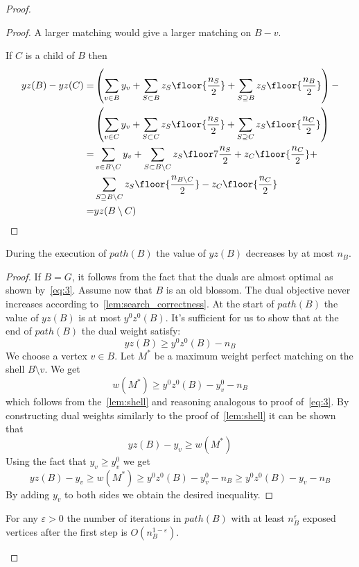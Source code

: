\begin{proof}
\begin{proof}
    A larger matching would give a larger matching on $B - v$.

    If $C$ is a child of $B$ then
    \begin{align*}
    yz(B) - yz(C) =& 
      \left(\sum_{v \in B} y_v + \sum_{S \subset B} z_S \floor{\frac{n_S}{2}} + \sum_{S \supseteq B} z_S \floor{\frac{n_B}{2}}\right) - \\
    & \left(\sum_{v \in C} y_v + \sum_{S \subset C} z_S \floor{\frac{n_S}{2}} + \sum_{S \supseteq C} z_S \floor{\frac{n_C}{2}}\right)  \\
    =& \sum_{v \in B \setminus C} y_v + \sum_{S \subset B \setminus C} z_S \floor7 {\frac{n_S}{2}} + z_C\floor{\frac{n_C}{2}} + \\
    & \sum_{S \supseteq B \setminus C} z_S \floor{\frac{n_{B \setminus C}}{2}} - z_C\floor{\frac{n_C}{2}} \\
    =& yz(B \setminus C)
    \end{align*}
\end{proof}

\begin{lemma}\label{lem:pathyz}
    During the execution of $path(B)$ the value of $yz(B)$ decreases by at most $n_B$.
\end{lemma}

\begin{proof}
    If $B = G$, it follows from the fact that the duals are almost optimal as shown by~\ref{eq:3}.
    Assume now that $B$ is an old blossom. The dual objective never increases according to~\ref{lem:search_correctness}. At the start of $path(B)$ the value of $yz(B)$ is at most $y^0z^0(B)$. It's sufficient for us to show that at the end of $path(B)$ the dual weight satisfy:
    \[ yz(B) \geq y^0z^0(B) - n_B \]
    We choose a vertex $v \in B$. Let $M^*$ be a maximum weight perfect matching on the shell $B \setminus v$. We get
    \[ w(M^*) \geq y^0z^0(B) - y^0_v - n_B \]
    which follows from the~\ref{lem:shell} and reasoning analogous to proof of~\ref{eq:3}. By constructing dual weights similarly to the proof of~\ref{lem:shell} it can be shown that
    \[ yz(B) - y_v \geq w(M^*) \]
    Using the fact that $y_v \geq y_v^0$ we get
    \[ yz(B) - y_v \geq w(M^*) \geq y^0z^0(B) - y^0_v - n_B \geq y^0z^0(B) - y_v - n_B \]
    By adding $y_v$ to both sides we obtain the desired inequality.
\end{proof}

\begin{lemma}\label{lem:epsilon}
    For any $\varepsilon > 0$ the number of iterations in $path(B)$ with at least $n_B^\varepsilon$ exposed vertices after the first step is $O(n_B^{1-\varepsilon})$.
\end{lemma}


\end{proof}
